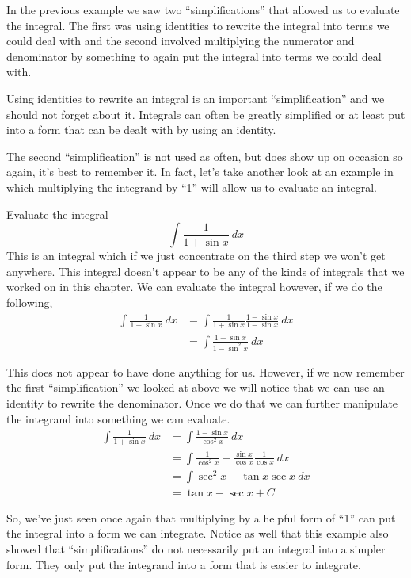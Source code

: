 In the previous example we saw two ``simplifications'' that allowed us to evaluate the integral. The first was using identities to rewrite the integral into terms we could deal with and the second involved multiplying the numerator and denominator by something to again put the integral into terms we could deal with.

Using identities to rewrite an integral is an important ``simplification'' and we should not forget about it. Integrals can often be greatly simplified or at least put into a form that can be dealt with by using an identity.

The second ``simplification'' is not used as often, but does show up on occasion so again, it's best to remember it. In fact, let's take another look at an example in which multiplying the integrand by ``1'' will allow us to evaluate an integral.

\begin{example}\label{ex_int_strat_sin}
Evaluate the integral
\[\int \frac{1}{1+\sin x}\ dx\]
\solution
This is an integral which if we just concentrate on the third step we won't get anywhere. This integral doesn't appear to be any of the kinds of integrals that we worked on in this chapter. We can evaluate the integral however, if we do the following,
\begin{align*}
	\int \frac{1}{1+\sin x}\ dx
	&= \int \frac{1}{1+\sin x} \frac{1-\sin x}{1-\sin x}\ dx \\
	&= \int \frac{1-\sin x}{1-\sin^2 x}\ dx 
\end{align*}

This does not appear to have done anything for us. However, if we now remember the first ``simplification'' we looked at above we will notice that we can use an identity to rewrite the denominator. Once we do that we can further manipulate the integrand into something we can evaluate.
\begin{align*}
	\int \frac{1}{1+\sin x}\ dx
	&= \int \frac{1-\sin x}{\cos^2 x}\ dx \\
	&= \int \frac{1}{\cos^2 x} - \frac{\sin x}{\cos x}\frac{1}{\cos x}\ dx \\
	&= \int \sec^2 x - \tan x \sec x\ dx \\
	&= \tan x - \sec x +C
\end{align*}
\end{example}

So, we've just seen once again that multiplying by a helpful form of ``1'' can put the integral into a form we can integrate. Notice as well that this example also showed that ``simplifications'' do not necessarily put an integral into a simpler form. They only put the integrand into a form that is easier to integrate.

